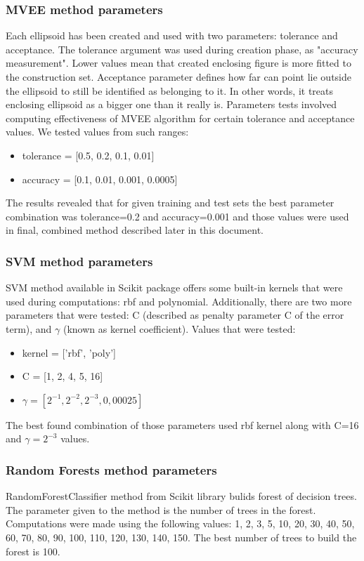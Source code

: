 \documentclass{llncs}
\begin{document}
\subsubsection{MVEE method parameters}
Each ellipsoid has been created and used with two parameters: tolerance and acceptance. The tolerance argument was used during creation phase, as "accuracy measurement". Lower values mean that created enclosing figure is more fitted to the construction set. Acceptance parameter defines how far can point lie outside the ellipsoid to still be identified as belonging to it. In other words, it treats enclosing ellipsoid as a bigger one than it really is.
Parameters tests involved computing effectiveness of MVEE algorithm for certain tolerance and acceptance values. We tested values from such ranges:
\begin{itemize}
	\item tolerance = [0.5, 0.2, 0.1, 0.01]
	\item accuracy = [0.1, 0.01, 0.001, 0.0005]
\end{itemize} 
The results revealed that for given training and test sets the best parameter combination was tolerance=0.2 and accuracy=0.001 and those values were used in final, combined method described later in this document.

\subsubsection{SVM method parameters}
SVM method available in Scikit package offers some built-in kernels that were used during computations: rbf and polynomial. Additionally, there are two more parameters that were tested: C (described as penalty parameter C of the error term), and $\gamma$ (known as kernel coefficient). Values that were tested:
\begin{itemize}
	\item kernel = ['rbf', 'poly']
	\item C = [1, 2, 4, 5, 16]
	\item $\gamma = [2^{-1}, 2^{-2}, 2^{-3}, 0,00025]$
\end{itemize}
The best found combination of those parameters used rbf kernel along with C=16 and $\gamma = 2^{-3}$ values.

\subsubsection{Random Forests method parameters}
RandomForestClassifier method from Scikit library bulids forest of decision trees. The parameter given to the method is the number of trees in the forest. Computations were made using the following values: 1, 2, 3, 5, 10, 20, 30, 40, 50, 60, 70, 80, 90, 100, 110, 120, 130, 140, 150. The best number of trees to build the forest is 100.
\end{document}
